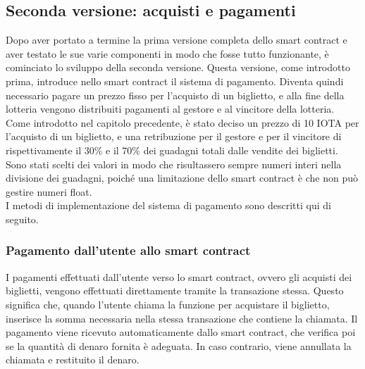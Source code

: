 \documentclass[12pt,a4paper,openright,twoside]{report}
\begin{document}
\subsection{Seconda versione: acquisti e pagamenti}
Dopo aver portato a termine la prima versione completa dello smart contract e aver testato le sue varie componenti in modo che fosse tutto funzionante, è cominciato lo sviluppo della seconda versione. Questa versione, come introdotto prima, introduce nello smart contract il sistema di pagamento. Diventa quindi necessario pagare un prezzo fisso per l'acquisto di un biglietto, e alla fine della lotteria vengono distribuiti pagamenti al gestore e al vincitore della lotteria. Come introdotto nel capitolo precedente, è stato deciso un prezzo di 10 IOTA per l'acquisto di un biglietto, e una retribuzione per il gestore e per il vincitore di rispettivamente il 30\% e il 70\% dei guadagni totali dalle vendite dei biglietti. Sono stati scelti dei valori in modo che risultassero sempre numeri interi nella divisione dei guadagni, poiché una limitazione dello smart contract è che non può gestire numeri float.\\
I metodi di implementazione del sistema di pagamento sono descritti qui di seguito.
\subsubsection{Pagamento dall'utente allo smart contract}
I pagamenti effettuati dall'utente verso lo smart contract, ovvero gli acquisti dei biglietti, vengono effettuati direttamente tramite la transazione stessa. Questo significa che, quando l'utente chiama la funzione per acquistare il biglietto, inserisce la somma necessaria nella stessa transazione che contiene la chiamata. Il pagamento viene ricevuto automaticamente dallo smart contract, che verifica poi se la quantità di denaro fornita è adeguata. In caso contrario, viene annullata la chiamata e restituito il denaro.
\end{document}
